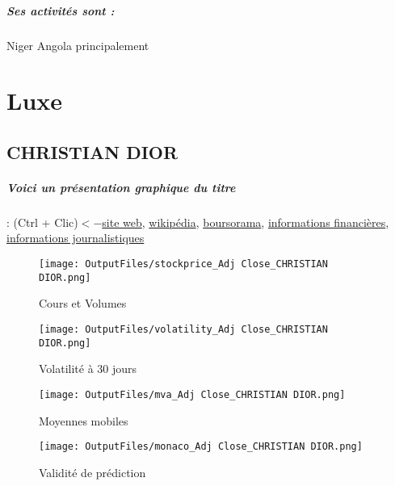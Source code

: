 \documentclass[11pt,a4paper]{report}%
\begin{document}
\paragraph{Ses activités sont : } Niger Angola principalement 
    
    \newpage\chapter{Luxe}


\section{CHRISTIAN DIOR}

\paragraph{Voici un présentation graphique du titre} : (Ctrl + Clic)$<-$\href{http://www.dior-finance.com/}{site web}, \href{https://fr.wikipedia.org/wiki/Christian_Dior_(entreprise)}{wikipédia}, \href{https://www.boursorama.com/cours/1rPCDI}{boursorama}, \href{https://www.qwant.com/?q=site:https:%2f%2fwww.easybourse.com%2faction-societe%2fCHRISTIAN-DIOR&t=web&client=ext-firefox-hp}{informations financières}, \href{https://bourse.lerevenu.com/cours-de-bourse/fiche-valeur-synthese/CHRISTIAN-DIOR/CDI-FR}{informations journalistiques}
\begin{figure}[!htb]
   \begin{minipage}{0.5\textwidth}
     \centering
     \texttt{[image: OutputFiles/stockprice\_Adj Close\_CHRISTIAN DIOR.png]}
     \caption{Cours et Volumes}\label{Fig:price_CHRISTIAN DIOR}
   \end{minipage}\hfill
   \begin{minipage}{0.5\textwidth}
     \centering
     \texttt{[image: OutputFiles/volatility\_Adj Close\_CHRISTIAN DIOR.png]}
     \caption{Volatilité à 30 jours}\label{Fig:volat_CHRISTIAN DIOR}
   \end{minipage}
\end{figure}
\begin{figure}[!htb]
   \begin{minipage}{0.5\textwidth}
     \centering
     \texttt{[image: OutputFiles/mva\_Adj Close\_CHRISTIAN DIOR.png]}
     \caption{Moyennes mobiles}\label{Fig:mva_CHRISTIAN DIOR}
   \end{minipage}\hfill
   \begin{minipage}{0.5\textwidth}
     \centering
     \texttt{[image: OutputFiles/monaco\_Adj Close\_CHRISTIAN DIOR.png]}
     \caption{Validité de prédiction}\label{Fig:prediction_CHRISTIAN DIOR}
   \end{minipage}
\end{figure}
\end{document}
